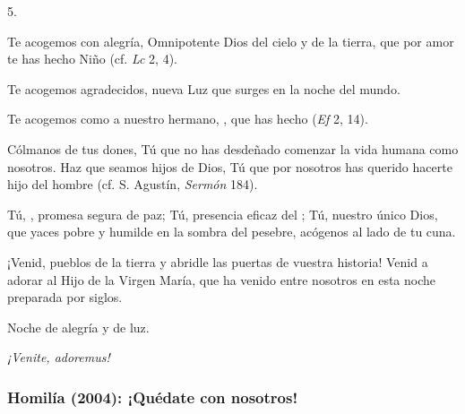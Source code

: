 \begin{body}
	5. \emph{}
	
	Te acogemos con alegría, Omnipotente Dios del cielo y de la tierra, que por amor te has hecho Niño \emph{} (cf. \emph{Lc} 2, 4).
	
	Te acogemos agradecidos, nueva Luz que surges en la noche del mundo.
	
	Te acogemos como a nuestro hermano, , que has hecho  (\emph{Ef} 2, 14).
	
	Cólmanos de tus dones, Tú que no has desdeñado comenzar la vida humana como nosotros. Haz que seamos hijos de Dios, Tú que por nosotros has querido hacerte hijo del hombre (cf. S. Agustín, \emph{Sermón} 184).
	
	Tú, , promesa segura de paz; Tú, presencia eficaz del ; Tú, nuestro único Dios, que yaces pobre y humilde en la sombra del pesebre, acógenos al lado de tu cuna.
	
	¡Venid, pueblos de la tierra y abridle las puertas de vuestra historia! Venid a adorar al Hijo de la Virgen María, que ha venido entre nosotros en esta noche preparada por siglos.
	
	Noche de alegría y de luz.
	
	\emph{¡Venite, adoremus!}
\end{body}


\subsubsection{Homilía (2004): ¡Quédate con nosotros!}


